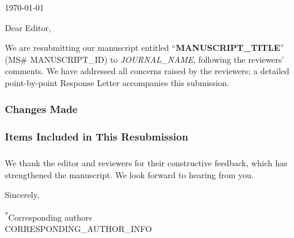 \documentclass[11pt]{article}
\newcommand{\journalname}{{{JOURNAL_NAME}}}
\newcommand{\manuscripttitle}{{{MANUSCRIPT_TITLE}}}
\newcommand{\msid}{{{MANUSCRIPT_ID}}}
\begin{document}
\noindent \today

\bigskip
\noindent Dear Editor,

\noindent We are resubmitting our manuscript entitled ``\textbf{\manuscripttitle}'' (MS\# \msid) to \textit{\journalname}, following the reviewers' comments. We have addressed all concerns raised by the reviewers; a detailed point-by-point Response Letter accompanies this submission.

\subsubsection*{Changes Made}

\subsubsection*{Items Included in This Resubmission}

\subsubsection{}
\noindent We thank the editor and reviewers for their constructive feedback, which has strengthened the manuscript. We look forward to hearing from you.

\bigskip
\noindent Sincerely,

\bigskip
{}

\medskip
\noindent\textsuperscript{*}Corresponding authors\\
{{CORRESPONDING_AUTHOR_INFO}}
\end{document}
